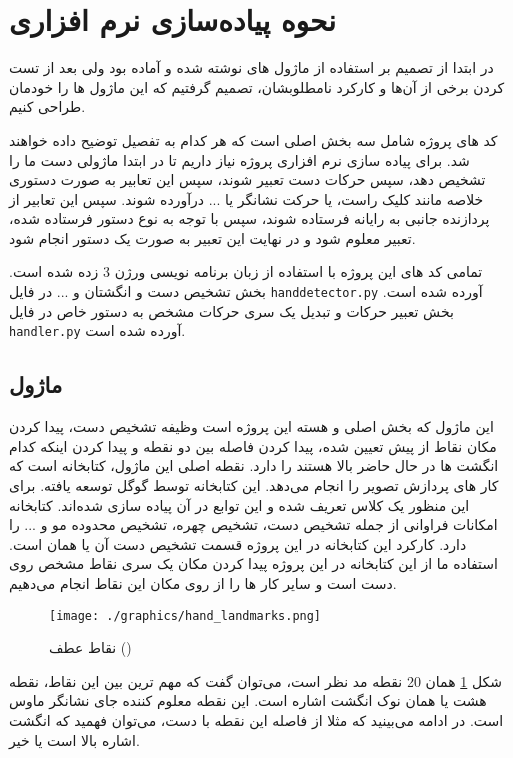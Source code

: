 \documentclass{article}
\begin{document}
\section{نحوه پیاده‌سازی نرم افزاری}
در ابتدا از تصمیم بر استفاده از ماژول های نوشته شده و آماده بود ولی بعد از تست کردن برخی از آن‌ها و کارکرد نامطلوبشان، تصمیم گرفتیم که این ماژول ها را خودمان طراحی کنیم.
 
کد های پروژه شامل سه بخش اصلی است که هر کدام به تفصیل توضیح داده خواهند شد. برای پیاده سازی نرم افزاری پروژه نیاز داریم تا در ابتدا ماژولی دست ما را تشخیص دهد، سپس حرکات دست تعبیر شوند، سپس این تعابیر به صورت دستوری خلاصه مانند کلیک راست، یا حرکت نشانگر یا ... درآورده شوند. سپس این تعابیر از پردازنده جانبی به رایانه فرستاده شوند، سپس با توجه به نوع دستور فرستاده شده، تعبیر   معلوم شود و در نهایت این تعبیر به صورت یک دستور  انجام شود.

تمامی کد های این پروژه با استفاده از زبان برنامه نویسی  ورژن 3 زده شده است. بخش تشخیص دست و انگشتان و ... در فایل
\verb~handdetector.py~
 آورده شده است. بخش تعبیر حرکات و تبدیل یک سری حرکات مشخص به دستور خاص در فایل 
 \verb~handler.py~
  آورده شده است.

\subsection{ماژول }
این ماژول که بخش اصلی و هسته این پروژه است وظیفه تشخیص دست، پیدا کردن مکان نقاط از پیش تعیین شده، پیدا کردن فاصله بین دو نقطه و پیدا کردن اینکه کدام انگشت ها در حال حاضر بالا هستند را دارد.
نقطه اصلی این ماژول، کتابخانه   است که کار های پردازش تصویر را انجام می‌دهد. این کتابخانه توسط گوگل توسعه یافته. برای این منظور یک کلاس  تعریف شده و این توابع در آن پیاده سازی شده‌اند.
کتابخانه  امکانات فراوانی از جمله تشخیص دست، تشخیص چهره، تشخیص محدوده مو و ... را دارد. کارکرد این کتابخانه در این پروژه قسمت تشخیص دست آن یا همان  است. استفاده ما از این کتابخانه در این پروژه پیدا کردن مکان یک سری نقاط مشخص روی دست است و سایر کار ها را از روی مکان این نقاط انجام می‌دهیم.

\begin{figure}
	\centering
	\texttt{[image: ./graphics/hand\_landmarks.png]}
	\caption{نقاط عطف ()}
	\label{landmark}
\end{figure}

شکل \ref{landmark} همان 20 نقطه مد نظر است، می‌توان گفت که مهم ترین بین این نقاط، نقطه هشت یا همان نوک انگشت اشاره است. این نقطه معلوم کننده جای نشانگر ماوس است. در ادامه می‌بینید که مثلا از فاصله این نقطه با دست، می‌توان فهمید که انگشت اشاره بالا است یا خیر.
\cite{medipipe}
\end{document}
